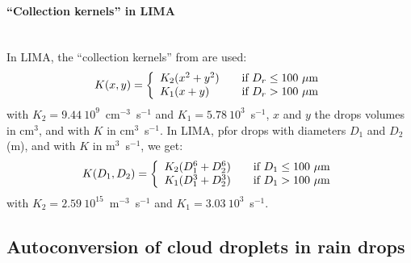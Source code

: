 {\paragraph{``Collection kernels'' in LIMA}
~\\
In LIMA, the ``collection kernels'' from \citet{Long1974} are used:
\begin{align}
 K(x,y) = \left\{
  \begin{array}{l l}
    K_2 (x^2 + y^2) & \quad \text{if } D_r \leq 100~\mu\text{m} \\
    K_1 (x + y)     & \quad \text{if } D_r >  100~\mu\text{m}
  \end{array} \right.
\end{align}
with $K_2 = 9.44~10^{9}$~cm$^{-3}$~s$^{-1}$ and $K_1 = 5.78~10^{3}$~s$^{-1}$, $x$ and $y$ the drops volumes in cm$^3$, and with $K$ in cm$^3$~s$^{-1}$. In LIMA, pfor drops with diameters $D_1$ and $D_2$ (m), and with $K$ in m$^3$~s$^{-1}$, we get:
\begin{align}
 K(D_1,D_2) = \left\{
  \begin{array}{l l}
    K_2 (D_1^6 + D_2^6) & \quad \text{if } D_1 \leq 100~\mu\text{m} \\
    K_1 (D_1^3 + D_2^3) & \quad \text{if } D_1 >  100~\mu\text{m}
  \end{array} \right.
\end{align}
with $K_2 = 2.59~10^{15}$~m$^{-3}$~s$^{-1}$ and $K_1 = 3.03~10^{3}$~s$^{-1}$.

\subsection{Autoconversion of cloud droplets in rain drops}
\label{droplets-autoconversion}

}
